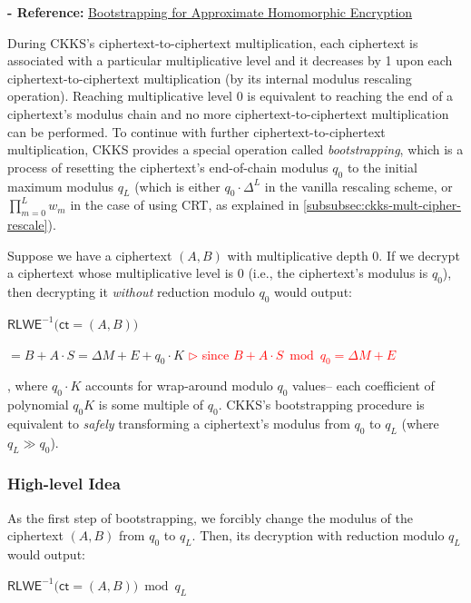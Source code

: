 \textbf{- Reference:} 
\href{https://eprint.iacr.org/2018/153.pdf}{Bootstrapping for Approximate Homomorphic Encryption}~\cite{ckks}



During CKKS's ciphertext-to-ciphertext multiplication, each ciphertext is associated with a particular multiplicative level and it decreases by 1 upon each ciphertext-to-ciphertext multiplication (by its internal modulus rescaling operation). Reaching multiplicative level 0 is equivalent to reaching the end of a ciphertext's modulus chain and no more ciphertext-to-ciphertext multiplication can be performed. To continue with further ciphertext-to-ciphertext multiplication, CKKS provides a special operation called \textit{bootstrapping}, which is a process of resetting the ciphertext's end-of-chain modulus $q_0$ to the initial maximum modulus $q_L$ (which is either $q_0\cdot\Delta^{L}$ in the vanilla rescaling scheme, or $\prod\limits_{m=0}^{L}w_m$ in the case of using CRT, as explained in \autoref{subsubsec:ckks-mult-cipher-rescale}). 


Suppose we have a ciphertext $(A, B)$ with multiplicative depth 0. If we decrypt a ciphertext whose multiplicative level is 0 (i.e., the ciphertext's modulus is $q_0$), then decrypting it \textit{without} reduction modulo $q_0$ would output:

$\textsf{RLWE}^{-1}\textbf{(}\textsf{ct} = (A, B)\textbf{)}$

$ = B + A\cdot S = \Delta M + E + q_0\cdot K$ \textcolor{red}{ $\rhd$ since $B + A\cdot S \bmod q_0 = \Delta M + E$}

, where $q_0 \cdot K$ accounts for wrap-around modulo $q_0$ values-- each coefficient of polynomial $q_0K$ is some multiple of $q_0$. CKKS's bootstrapping procedure is equivalent to \textit{safely} transforming a ciphertext's modulus from $q_0$ to $q_L$ (where $q_L \gg q_0$).



\subsubsection{High-level Idea}
\label{subsubsec:ckks-bootstrapping-high-level}

As the first step of bootstrapping, we forcibly change the modulus of the ciphertext $(A, B)$ from $q_0$ to $q_L$. Then, its decryption with reduction modulo $q_L$ would output:

$\textsf{RLWE}^{-1}\textbf{(}\textsf{ct} = (A, B)\textbf{)} \bmod q_L$

